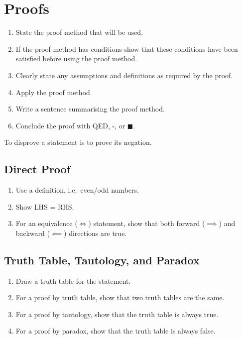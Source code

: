 \documentclass{article}
\begin{document}
\section{Proofs}
\begin{tcolorboxlarge}[title={Proof Structure}]
    \begin{enumerate}[leftmargin=3.5em, itemsep=0.2em, topsep=0.35em]
        \item State the proof method that will be used.
        \item If the proof method has conditions show that these conditions have been satisfied before using the proof method.
        \item Clearly state any assumptions and definitions as required by the proof.
        \item Apply the proof method.
        \item Write a sentence summarising the proof method.
        \item Conclude the proof with QED, \(\square\), or \(\blacksquare\).
    \end{enumerate}
\end{tcolorboxlarge}
\begin{note}[Disprove]
    To disprove a statement is to prove its negation.
\end{note}
%
\subsection{Direct Proof}
\begin{enumerate}
    \item Use a definition, i.e.\ even/odd numbers.
    \item Show LHS = RHS\@.
    \item For an equivalence (\(\iff\)) statement, show that both forward (\(\implies\)) and backward (\(\impliedby\)) directions are true.
\end{enumerate}
%
\subsection{Truth Table, Tautology, and Paradox}
\begin{enumerate}
    \item Draw a truth table for the statement.
    \item For a proof by truth table, show that two truth tables are the same.
    \item For a proof by tautology, show that the truth table is always true.
    \item For a proof by paradox, show that the truth table is always false.
\end{enumerate}
%
\end{document}
